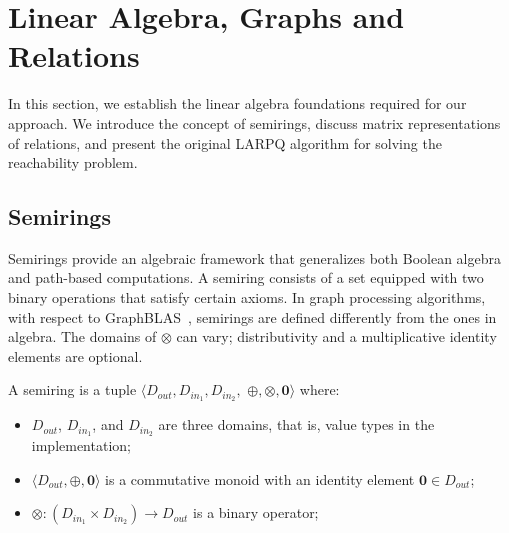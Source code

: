 \section{Linear Algebra, Graphs and Relations}\label{sec:la-graphs}

In this section, we establish the linear algebra foundations required for our approach. We introduce the concept of semirings, discuss matrix representations of relations, and present the original LARPQ algorithm for solving the reachability problem.

\subsection{Semirings}

Semirings provide an algebraic framework that generalizes both Boolean algebra and path-based computations.
A semiring consists of a set equipped with two binary operations that satisfy certain axioms.
In graph processing algorithms, with respect to GraphBLAS~\cite{Kepner2016MathematicalFO}, semirings are defined differently from the ones in algebra.
The domains of $\otimes$ can vary; distributivity and a multiplicative identity elements are optional.

\begin{definition}[Semiring]%
	A semiring is a tuple $\langle D_{out}, D_{in_1}, D_{in_2},$ $\oplus, \otimes, \mathbf{0} \rangle$ where:
	\begin{itemize}
		\item $D_{out}$, $D_{in_1}$, and $D_{in_2}$ are three domains, that is, value types in the implementation;
		\item $\langle D_{out}, \oplus, \mathbf{0} \rangle$ is a commutative monoid with an identity element $\mathbf{0} \in D_{out}$;
		\item $\otimes: (D_{in_1} \times D_{in_2}) \to D_{out} $ is a binary operator;
	\end{itemize}
\end{definition}

